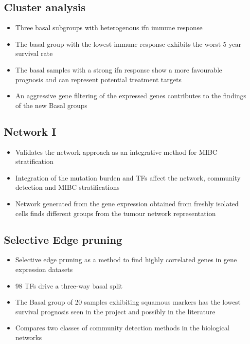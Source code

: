 \subsection*{Cluster analysis}

\begin{itemize}
    \item Three basal subgroups with heterogenous \acrfull{ifn} immune response
    \item The basal group with the lowest immune response exhibits the worst 5-year survival rate
    \item The basal samples with a strong \acrshort{ifn} response show a more favourable prognosis and can represent potential treatment targets
    \item An aggressive gene filtering of the expressed genes contributes to the findings of the new Basal groups
\end{itemize}

\subsection*{Network I}

\begin{itemize}
    \item Validates the network approach as an integrative method for MIBC stratification
     \item Integration of the mutation burden and TFs affect the network, community detection and MIBC stratifications
     \item Network generated from the gene expression obtained from freshly isolated cells finds different groups from the tumour network representation
\end{itemize}

\subsection*{Selective Edge pruning}

\begin{itemize}
    \item Selective edge pruning as a method to find highly correlated genes in gene expression datasets 
    \item 98 TFs drive a three-way basal split
    \item The Basal group of 20 samples exhibiting squamous markers has the lowest survival prognosis seen in the project and possibly in the literature
    \item Compares two classes of community detection methods in the biological networks
\end{itemize}

